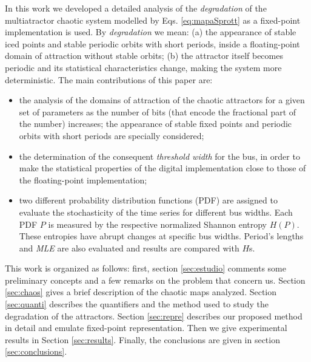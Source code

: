 In this work we developed a detailed analysis of the
\textsl{degradation} of the multiatractor chaotic system modelled
by Eqs. \ref{eq:mapaSprott} as a fixed-point implementation is used. By
\textsl{degradation} we mean:  (a) the appearance of stable iced
points and stable periodic orbits with short periods, inside a
floating-point domain of attraction without stable orbits; (b) the
attractor itself becomes periodic and its statistical
characteristics change, making the system more deterministic. The main contributions of this paper are: 
\begin{itemize}
\item the analysis of the domains of
attraction of the chaotic attractors for a given set of parameters
as the number of bits (that encode the fractional part of the number)
increases; the appearance of stable fixed points and periodic
orbits with short periods are specially considered;
\item the  determination of the consequent \textsl{threshold width} for the bus, in order to make the  statistical
 properties of the digital implementation close to those of the floating-point implementation; 
\item  two different probability distribution functions (PDF) are assigned  to evaluate the stochasticity of the time series for different bus widths. Each PDF  $P$ is measured by the respective normalized Shannon entropy $H(P)$. These entropies have abrupt changes at specific bus widths. Period's lengths and \textsl{MLE} are also evaluated and results are compared with $H$s.
\end{itemize}
This work is organized as follows: first, section \ref{sec:estudio} comments some preliminary concepts and a few remarks on the problem that concern us. Section \ref{sec:chaos} gives a
brief description of the chaotic maps analyzed. Section \ref{sec:quanti} describes the quantifiers and the method used to study the degradation of the attractors. Section \ref{sec:repre} describes our proposed method in detail and emulate fixed-point representation. Then we give experimental results
in Section \ref{sec:results}. Finally, the conclusions are given in section \ref{sec:conclusions}.
